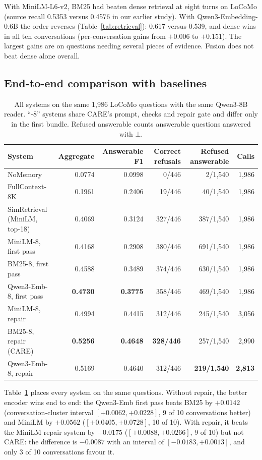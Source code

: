 \documentclass[10pt]{article}
\theoremstyle{plain}
\theoremstyle{definition}
\theoremstyle{remark}
\newcommand{\care}{\textsc{CARE}}
\begin{document}
With MiniLM-L6-v2, BM25 had beaten dense retrieval at eight turns on LoCoMo
(source recall 0.5353 versus 0.4576 in our earlier study). With
Qwen3-Embedding-0.6B the order reverses (Table~\ref{tab:retrieval}): 0.617 versus 0.539, and
dense wins in all ten conversations (per-conversation gains from $+0.006$ to
$+0.151$). The largest gains are on questions needing several pieces of evidence.
Fusion does not beat dense alone overall.

\subsection{End-to-end comparison with baselines}

\begin{table}[t]
\centering
\caption{All systems on the same 1,986 LoCoMo questions with the same Qwen3-8B
reader. ``-8'' systems share \care{}'s prompt, checks and repair gate and differ only
in the first bundle. Refused answerable counts answerable questions answered with $\bot$.}
\label{tab:e2e}
\small
\begin{tabular}{lrrrrr}
\toprule
System & Aggregate & Answerable F1 & Correct refusals & Refused answerable & Calls \\
\midrule
NoMemory & 0.0774 & 0.0998 & 0/446 & 2/1,540 & 1,986 \\
FullContext-8K & 0.1961 & 0.2406 & 19/446 & 40/1,540 & 1,986 \\
SimRetrieval (MiniLM, top-18) & 0.4069 & 0.3124 & 327/446 & 387/1,540 & 1,986 \\
\midrule
MiniLM-8, first pass & 0.4168 & 0.2908 & 380/446 & 691/1,540 & 1,986 \\
BM25-8, first pass & 0.4588 & 0.3489 & 374/446 & 630/1,540 & 1,986 \\
Qwen3-Emb-8, first pass & \textbf{0.4730} & \textbf{0.3775} & 358/446 & 469/1,540 & 1,986 \\
\midrule
MiniLM-8, repair & 0.4994 & 0.4415 & 312/446 & 245/1,540 & 3,056 \\
BM25-8, repair (\care{}) & \textbf{0.5256} & \textbf{0.4648} & \textbf{328/446} & 257/1,540 & 2,990 \\
Qwen3-Emb-8, repair & 0.5169 & 0.4640 & 312/446 & \textbf{219/1,540} & \textbf{2,813} \\
\bottomrule
\end{tabular}
\end{table}

Table~\ref{tab:e2e} places every system on the same questions. Without repair, the
better encoder wins end to end: the Qwen3-Emb first pass beats BM25 by $+0.0142$
(conversation-cluster interval $[+0.0062,+0.0228]$, 9 of 10 conversations better) and
MiniLM by $+0.0562$ ($[+0.0405,+0.0728]$, 10 of 10). With repair, it beats the MiniLM
repair system by $+0.0175$ ($[+0.0088,+0.0266]$, 9 of 10) but not \care{}: the
difference is $-0.0087$ with an interval of $[-0.0183,+0.0013]$, and only 3 of 10
conversations favour it.
\end{document}
